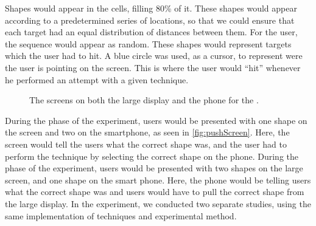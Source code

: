 Shapes would appear in the cells, filling 80\% of it. 
These shapes would appear according to a predetermined series of locations, so that we could ensure that each target had an equal distribution of distances between them. 
For the user, the sequence would appear as random. 
These shapes would represent targets which the user had to hit.
A blue circle was used, as a cursor, to represent were the user is pointing on the screen.
This is where the user would ``hit'' whenever he performed an attempt with a given technique.

\begin{figure}[H]
	\hspace{0.01\columnwidth}
	\caption{The screens on both the large display and the phone for the \accuracy.}
\end{figure}

During the \push phase of the experiment, users would be presented with one shape on the screen and two on the smartphone, as seen in \cref{fig:pushScreen}.
Here, the screen would tell the users what the correct shape was, and the user had to perform the technique by selecting the correct shape on the phone.
During the \pull phase of the experiment, users would be presented with two shapes on the large screen, and one shape on the smart phone.
Here, the phone would be telling users what the correct shape was and users would have to pull the correct shape from the large display. 
In the experiment, we conducted two separate studies, using the same implementation of techniques and experimental method. 

